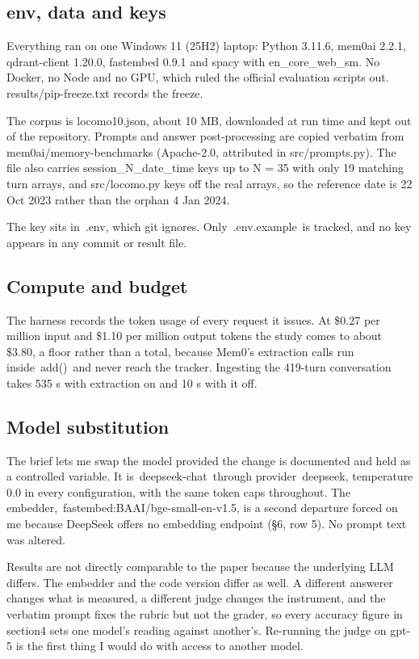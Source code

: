 \documentclass[11pt,a4paper]{article}
\begin{document}
\subsection{env, data and keys}

Everything ran on one Windows 11 (25H2) laptop: Python 3.11.6, mem0ai 2.2.1, qdrant-client 1.20.0, fastembed 0.9.1 and spacy with en\_core\_web\_sm. No Docker, no Node and no GPU, which ruled the official evaluation scripts out. results/pip-freeze.txt records the freeze.

The corpus is locomo10.json, about 10 MB, downloaded at run time and kept out of the repository. Prompts and answer post-processing are copied verbatim from mem0ai/memory-benchmarks (Apache-2.0, attributed in src/prompts.py). The file also carries session\_N\_date\_time keys up to N = 35 with only 19 matching turn arrays, and src/locomo.py keys off the real arrays, so the reference date is 22 Oct 2023 rather than the orphan 4 Jan 2024.

The key sits in~.env, which git ignores. Only~.env.example~is tracked, and no key appears in any commit or result file.

\subsection{Compute and budget}

The harness records the token usage of every request it issues. At \$0.27 per million input and \$1.10 per million output tokens the study comes to about \$3.80, a floor rather than a total, because Mem0's extraction calls run inside~add()~and never reach the tracker. Ingesting the 419-turn conversation takes 535 s with extraction on and 10 s with it off.

\subsection{Model substitution}

The brief lets me swap the model provided the change is documented and held as a controlled variable. It is~deepseek-chat~through provider~deepseek, temperature 0.0 in every configuration, with the same token caps throughout. The embedder,~fastembed:BAAI/bge-small-en-v1.5, is a second departure forced on me because DeepSeek offers no embedding endpoint (§6, row 5). No prompt text was altered.

Results are not directly comparable to the paper because the underlying LLM differs. The embedder and the code version differ as well. A different answerer changes what is measured, a different judge changes the instrument, and the verbatim prompt fixes the rubric but not the grader, so every accuracy figure in section4 sets one model's reading against another's. Re-running the judge on gpt-5 is the first thing I would do with access to another model.
\end{document}
